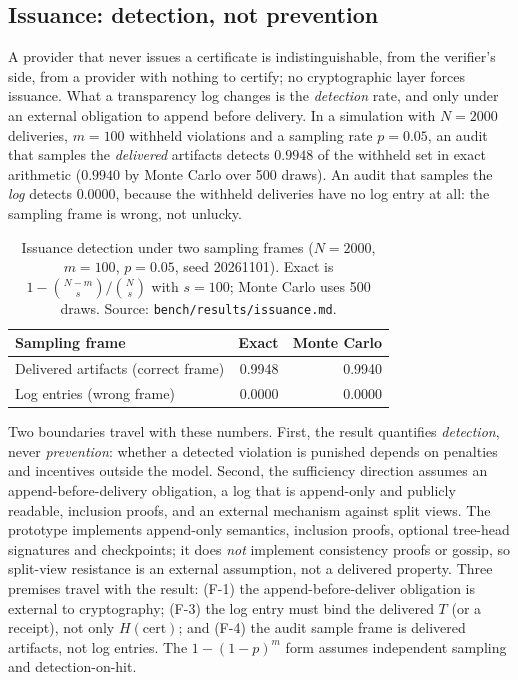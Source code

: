 \documentclass[10pt,journal,compsoc]{IEEEtran}
\newcommand{\tabfont}{\footnotesize}
\begin{document}
\subsection{Issuance: detection, not prevention}
\label{sec:eval-issuance}

A provider that never issues a certificate is indistinguishable, from the
verifier's side, from a provider with nothing to certify; no cryptographic
layer forces issuance. What a transparency log changes is the \emph{detection}
rate, and only under an external obligation to append before delivery. In a
simulation with $N=2000$ deliveries, $m=100$ withheld violations and a sampling
rate $p=0.05$, an audit that samples the \emph{delivered} artifacts detects
$0.9948$ of the withheld set in exact arithmetic ($0.9940$ by Monte Carlo over
500 draws). An audit that samples the \emph{log} detects $0.0000$, because the
withheld deliveries have no log entry at all: the sampling frame is wrong, not
unlucky.

\begin{table}[t]
\centering
\caption{Issuance detection under two sampling frames ($N=2000$, $m=100$,
$p=0.05$, seed 20261101). Exact is $1-\binom{N-m}{s}/\binom{N}{s}$ with $s=100$;
Monte Carlo uses 500 draws. Source: \texttt{bench/results/issuance.md}.}
\label{tab:issuance}
\tabfont
\begin{tabular}{@{}lrr@{}}
\toprule
Sampling frame & Exact & Monte Carlo \\
\midrule
Delivered artifacts (correct frame) & 0.9948 & 0.9940 \\
Log entries (wrong frame) & 0.0000 & 0.0000 \\
\bottomrule
\end{tabular}
\end{table}

Two boundaries travel with these numbers. First, the result quantifies
\emph{detection}, never \emph{prevention}: whether a detected violation is
punished depends on penalties and incentives outside the model. Second, the
sufficiency direction assumes an append-before-delivery obligation, a log that
is append-only and publicly readable, inclusion proofs, and an external
mechanism against split views. The prototype implements append-only semantics,
inclusion proofs, optional tree-head signatures and checkpoints; it does
\emph{not} implement consistency proofs or gossip, so split-view resistance is
an external assumption, not a delivered property. Three premises travel with the
result: (F-1) the append-before-deliver obligation is external to cryptography;
(F-3) the log entry must bind the delivered $T$ (or a receipt), not only
$H(\mathrm{cert})$; and (F-4) the audit sample frame is delivered artifacts, not
log entries. The $1-(1-p)^m$ form assumes independent sampling and
detection-on-hit.
\end{document}
